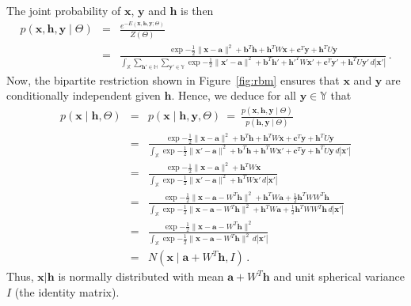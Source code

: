 \documentclass[a4paper]{article}
\newcommand{\v}[1]{\mathbf{#1}}
\begin{document}
The joint probability of $\v{x}$, $\v{y}$ and $\v{h}$ is then
\begin{eqnarray}
    p(\v{x},\v{h},\v{y}\;|\;\Theta) & = & \frac{e^{-E(\v{x},\v{h},\v{y}; \Theta)}}{Z(\Theta)}
\nonumber\\&=&
\frac{
    \exp{-\frac{1}{2}\|\v{x}-\v{a}\|^2+\v{b}^T\v{h}+\v{h}^T W\v{x}+\v{c}^T\v{y}+\v{h}^T U\v{y}}
}
{\int_{\mathbb{X}}\sum_{\v{h}'\in\mathbb{H}}\sum_{\v{y}'\in\mathbb{Y}}
   \exp{-\frac{1}{2}\|\v{x}'-\v{a}\|^2+\v{b}^T\v{h}'+\v{h}'^T W\v{x}'+\v{c}^T\v{y}'+\v{h}^T U\v{y}'}
   \,d|\v{x}'|
}\,.
\end{eqnarray}
Now, the bipartite restriction shown in Figure~\ref{fig:rbm} ensures that $\v{x}$ and $\v{y}$
are conditionally independent given $\v{h}$.
Hence, we deduce for all $\v{y}\in\mathbb{Y}$ that
\begin{eqnarray}
    p(\v{x}\;|\;\v{h},\Theta) & = & p(\v{x}\;|\;\v{h},\v{y},\Theta)
    ~=~\frac{p(\v{x},\v{h},\v{y}\;|\;\Theta)}{p(\v{h},\v{y}\;|\;\Theta)}
\nonumber\\&=&
\frac{
    \exp{-\frac{1}{2}\|\v{x}-\v{a}\|^2+\v{b}^T\v{h}+\v{h}^T W\v{x}+\v{c}^T\v{y}+\v{h}^T U\v{y}}
}
{
    \int_{\mathbb{X}}
    \exp{-\frac{1}{2}\|\v{x}'-\v{a}\|^2+\v{b}^T\v{h}+\v{h}^T W\v{x}'+\v{c}^T\v{y}+\v{h}^T U\v{y}}
    \,d|\v{x}'|
}
\nonumber\\&=&
\frac{
    \exp{-\frac{1}{2}\|\v{x}-\v{a}\|^2+\v{h}^T W\v{x}}
}
{
    \int_{\mathbb{X}}\exp{-\frac{1}{2}\|\v{x}'-\v{a}\|^2+\v{h}^T W\v{x}'}\,d|\v{x}'|
}
\nonumber\\&=&
\frac{
    \exp{-\frac{1}{2}\|\v{x}-\v{a}-W^T\v{h}\|^2+\v{h}^T W\v{a}+\frac{1}{2}\v{h}^T WW^T \v{h}}
}
{
    \int_{\mathbb{X}}
    \exp{-\frac{1}{2}\|\v{x}-\v{a}-W^T\v{h}\|^2+\v{h}^T W\v{a}+\frac{1}{2}\v{h}^T WW^T \v{h}}
    \,d|\v{x}'|
}
\nonumber\\&=&
\frac{
    \exp{-\frac{1}{2}\|\v{x}-\v{a}-W^T\v{h}\|^2}
}
{
    \int_{\mathbb{X}}\exp{-\frac{1}{2}\|\v{x}-\v{a}-W^T\v{h}\|^2}\,d|\v{x}'|
}
\nonumber\\&=& N(\v{x}\;|\;\v{a}+W^T\v{h},I)\,.
\end{eqnarray}
Thus, $\v{x}|\v{h}$ is normally distributed with mean $\v{a}+W^T\v{h}$ and unit spherical 
variance $I$ (the identity matrix).
\end{document}
